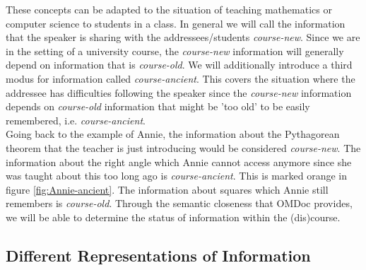 \documentclass[twoside, 12pt]{article}
\begin{document}
These concepts can be adapted to the situation of teaching mathematics or computer science to students in a class. In general we will call the information that the speaker is sharing with the addressees/students \textit{course-new}. Since we are in the setting of a university course, the \textit{course-new} information will generally depend on information that is \textit{course-old}. We will additionally introduce a third modus for information called \textit{course-ancient}. This covers the situation where the addressee has difficulties following the speaker since the \textit{course-new} information depends on \textit{course-old} information that might be 'too old' to be easily remembered, i.e. \textit{course-ancient}.\\

Going back to the example of Annie, the information about the Pythagorean theorem that the teacher is just introducing would be considered \textit{course-new}. The information about the right angle which Annie cannot access anymore since she was taught about this too long ago is \textit{course-ancient}. This is marked orange in figure \ref{fig:Annie-ancient}. The information about squares which Annie still remembers is \textit{course-old}. Through the semantic closeness that OMDoc provides, we will be able to determine the status of information within the (dis)course.  \\

\subsection{Different Representations of Information}
\label{sec:inforep}

\end{document}

